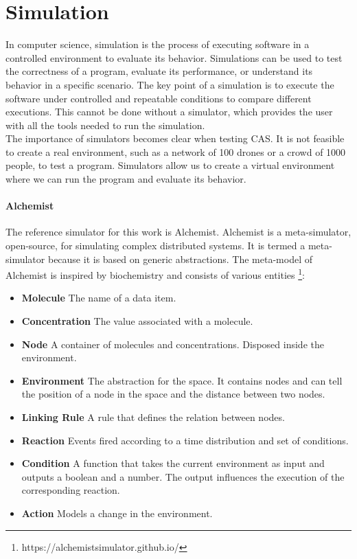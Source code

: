 \documentclass[12pt,a4paper,openright,twoside]{book}
\begin{document}
\section{Simulation}

In computer science, simulation is the process of executing software in a controlled environment to evaluate its behavior.
Simulations can be used to test the correctness of a program, evaluate its performance, or understand its behavior in a specific scenario.
The key point of a simulation is to execute the software under controlled and repeatable conditions to compare different executions. \cite{DBLP:journals/cacm/CollbergP16}
This cannot be done without a simulator, which provides the user with all the tools needed to run the simulation. \cite{argun2021simulation, bagrodia1998parsec} \\
The importance of simulators becomes clear when testing \ac{CAS}.
It is not feasible to create a real environment, such as a network of 100 drones or a crowd of 1000 people, to test a program.
Simulators allow us to create a virtual environment where we can run the program and evaluate its behavior.

\paragraph*{Alchemist}

The reference simulator for this work is Alchemist. \cite{Pianini_2013}
Alchemist is a meta-simulator, open-source, for simulating complex distributed systems. It is termed a meta-simulator because it is based on generic abstractions.
The meta-model of Alchemist is inspired by biochemistry and consists of various entities \footnote{https://alchemistsimulator.github.io/}:
\begin{itemize}
  \item \textbf{Molecule} The name of a data item.
  \item \textbf{Concentration} The value associated with a molecule.
  \item \textbf{Node} A container of molecules and concentrations. Disposed inside the environment.
  \item \textbf{Environment} The abstraction for the space. It contains nodes and can tell the position of a node in the space and the distance between two nodes.
  \item \textbf{Linking Rule} A rule that defines the relation between nodes.
  \item \textbf{Reaction} Events fired according to a time distribution and set of conditions.
  \item \textbf{Condition} A function that takes the current environment as input and outputs a boolean and a number. The output influences the execution of the corresponding reaction.
  \item \textbf{Action} Models a change in the environment.
\end{itemize}
\end{document}
